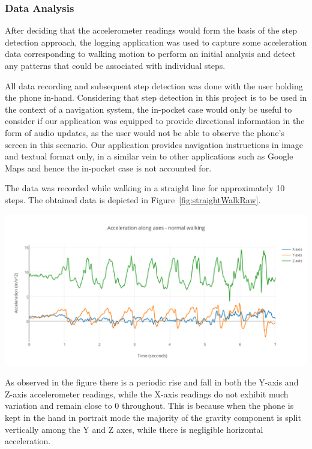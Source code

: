 \documentclass[12pt,a4paper]{report}
\begin{document}
\subsubsection{Data Analysis}

After deciding that the accelerometer readings would form the basis of the step detection approach, the logging application was used to capture some acceleration data corresponding to walking motion to perform an initial analysis and detect any patterns that could be associated with individual steps. 

All data recording and subsequent step detection was done with the user holding the phone in-hand. Considering that step detection in this project is to be used in the context of a navigation system, the in-pocket case would only be useful to consider if our application was equipped to provide directional information in the form of audio updates, as the user would not be able to observe the phone's screen in this scenario. Our application provides navigation instructions in image and textual format only, in a similar vein to other applications such as Google Maps and hence the in-pocket case is not accounted for.  

The data was recorded while walking in a straight line for approximately 10 steps. 
The obtained data is depicted in Figure~\ref{fig:straightWalkRaw}. 

\begin{center}
\includegraphics[scale=0.9]{images/straightWalkRaw.png}
\label{fig:straightWalkRaw}
\end{center}

As observed in the figure there is a periodic rise and fall in both the Y-axis and Z-axis accelerometer readings, while the X-axis readings do not exhibit much variation and remain close to 0 throughout. This is because when the phone is kept in the hand in portrait mode the majority of the gravity component is split vertically among the Y and Z axes, while there is negligible horizontal acceleration.
\end{document}

